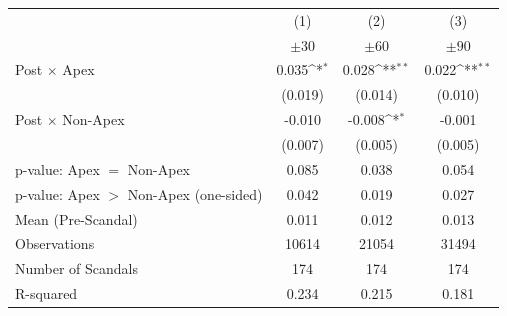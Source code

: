 {
\def\sym#1{\ifmmode^{#1}\else\(^{#1}\)\fi}
\begin{tabular}{l*{3}{c}}
\toprule
            &\multicolumn{1}{c}{(1)}&\multicolumn{1}{c}{(2)}&\multicolumn{1}{c}{(3)}\\
            &\multicolumn{1}{c}{$\pm 30$}&\multicolumn{1}{c}{$\pm 60$}&\multicolumn{1}{c}{$\pm 90$}\\
\midrule
Post $\times$ Apex&       0.035\sym{*}  &       0.028\sym{**} &       0.022\sym{**} \\
            &     (0.019)         &     (0.014)         &     (0.010)         \\
Post $\times$ Non-Apex&      -0.010         &      -0.008\sym{*}  &      -0.001         \\
            &     (0.007)         &     (0.005)         &     (0.005)         \\
\midrule
p-value: Apex $=$ Non-Apex&       0.085         &       0.038         &       0.054         \\
p-value: Apex $>$ Non-Apex (one-sided)&       0.042         &       0.019         &       0.027         \\
Mean (Pre-Scandal)&       0.011         &       0.012         &       0.013         \\
Observations&       10614         &       21054         &       31494         \\
Number of Scandals&         174         &         174         &         174         \\
R-squared   &       0.234         &       0.215         &       0.181         \\
\bottomrule
\end{tabular}
}
